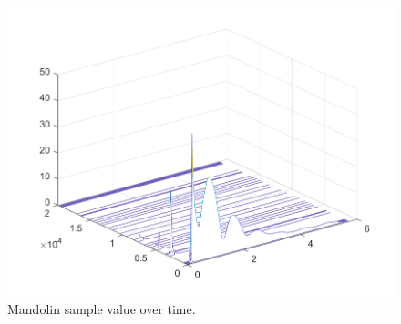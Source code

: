 \documentclass{article}
\begin{document}
            \begin{figure}[h]
                \includegraphics[scale=0.5]{images/specWaterfallMando2.png}%
                \centering
                \caption{Mandolin sample value over time.}
                \label{specWaterfallMando2}
            \end{figure}
\end{document}
